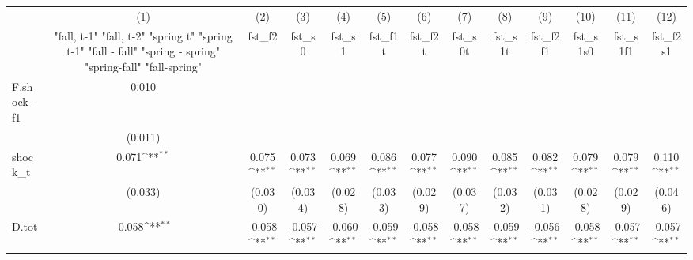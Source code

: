 {
\def\sym#1{\ifmmode^{#1}\else\(^{#1}\)\fi}
\begin{tabular}{l*{12}{c}}
\toprule
            &\multicolumn{1}{c}{(1)}&\multicolumn{1}{c}{(2)}&\multicolumn{1}{c}{(3)}&\multicolumn{1}{c}{(4)}&\multicolumn{1}{c}{(5)}&\multicolumn{1}{c}{(6)}&\multicolumn{1}{c}{(7)}&\multicolumn{1}{c}{(8)}&\multicolumn{1}{c}{(9)}&\multicolumn{1}{c}{(10)}&\multicolumn{1}{c}{(11)}&\multicolumn{1}{c}{(12)}\\
            &\multicolumn{1}{c}{  "fall, t-1" "fall, t-2" "spring t" "spring t-1"  "fall - fall" "spring - spring" "spring-fall" "fall-spring" }&\multicolumn{1}{c}{fst\_f2}&\multicolumn{1}{c}{fst\_s0}&\multicolumn{1}{c}{fst\_s1}&\multicolumn{1}{c}{fst\_f1t}&\multicolumn{1}{c}{fst\_f2t}&\multicolumn{1}{c}{fst\_s0t}&\multicolumn{1}{c}{fst\_s1t}&\multicolumn{1}{c}{fst\_f2f1}&\multicolumn{1}{c}{fst\_s1s0}&\multicolumn{1}{c}{fst\_s1f1}&\multicolumn{1}{c}{fst\_f2s1}\\
\midrule
F.shock\_f1  &       0.010         &                     &                     &                     &                     &                     &                     &                     &                     &                     &                     &                     \\
            &     (0.011)         &                     &                     &                     &                     &                     &                     &                     &                     &                     &                     &                     \\
\addlinespace
shock\_t     &       0.071\sym{**} &       0.075\sym{**} &       0.073\sym{**} &       0.069\sym{**} &       0.086\sym{**} &       0.077\sym{**} &       0.090\sym{**} &       0.085\sym{**} &       0.082\sym{**} &       0.079\sym{**} &       0.079\sym{**} &       0.110\sym{**} \\
            &     (0.033)         &     (0.030)         &     (0.034)         &     (0.028)         &     (0.033)         &     (0.029)         &     (0.037)         &     (0.032)         &     (0.031)         &     (0.028)         &     (0.029)         &     (0.046)         \\
\addlinespace
D.tot       &      -0.058\sym{**} &      -0.058\sym{**} &      -0.057\sym{**} &      -0.060\sym{**} &      -0.059\sym{**} &      -0.058\sym{**} &      -0.058\sym{**} &      -0.059\sym{**} &      -0.056\sym{**} &      -0.058\sym{**} &      -0.057\sym{**} &      -0.057\sym{**} \\

\end{tabular}}
